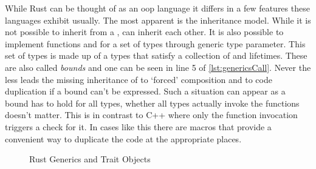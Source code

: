 \documentclass[thesis]{subfiles}
\begin{document}
    While Rust can be thought of as an \gls{oop} language it differs in a few features these languages exhibit usually.
    The most apparent is the inheritance model.
    While it is not possible to inherit from a \struct, \traits can inherit each other.
    It is also possible to implement functions and \traits for a set of types through generic type parameter.
    This set of types is made up of a types that satisfy a collection of \traits and lifetimes.
    These are also called \emph{bounds} and one can be seen in line 5 of \autoref{lst:genericsCall}.
    Never the less leads the missing inheritance of \structs to `forced' composition and to code duplication if a bound can't be expressed.
    Such a situation can appear as a bound has to hold for all types, whether all types actually invoke the functions doesn't matter.
    This is in contrast to C++ where only the function invocation triggers a check for it.
    In cases like this there are macros that provide a convenient way to duplicate the code at the appropriate places.

    \newsavebox{\genericsBase}
    \begin{lrbox}{\genericsBase}%
      \begin{minipage}{.45\linewidth}
        
      \end{minipage}
    \end{lrbox}

    \newsavebox{\genericsCall}
    \begin{lrbox}{\genericsCall}
      \begin{minipage}{.45\linewidth}
        
      \end{minipage}
    \end{lrbox}

    \begin{figure}[ht]
      \captionsetup{type=lstlisting}
       \hfill%
      \caption{Rust Generics and Trait Objects}\label{lst:generics}
    \end{figure}
\end{document}
